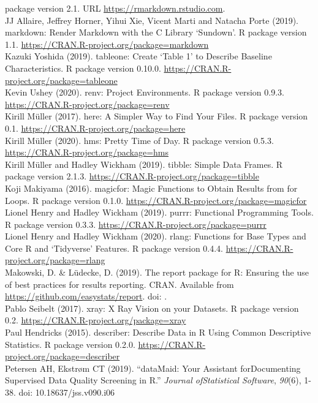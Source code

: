 \documentclass[
]{article}
\begin{document}
package version 2.1. URL \url{https://rmarkdown.rstudio.com}.\\
JJ Allaire, Jeffrey Horner, Yihui Xie, Vicent Marti and Natacha Porte
(2019). markdown: Render Markdown with the C Library `Sundown'. R
package version 1.1. \url{https://CRAN.R-project.org/package=markdown}\\
Kazuki Yoshida (2019). tableone: Create `Table 1' to Describe Baseline
Characteristics. R package version 0.10.0.
\url{https://CRAN.R-project.org/package=tableone}\\
Kevin Ushey (2020). renv: Project Environments. R package version 0.9.3.
\url{https://CRAN.R-project.org/package=renv}\\
Kirill Müller (2017). here: A Simpler Way to Find Your Files. R package
version 0.1. \url{https://CRAN.R-project.org/package=here}\\
Kirill Müller (2020). hms: Pretty Time of Day. R package version 0.5.3.
\url{https://CRAN.R-project.org/package=hms}\\
Kirill Müller and Hadley Wickham (2019). tibble: Simple Data Frames. R
package version 2.1.3. \url{https://CRAN.R-project.org/package=tibble}\\
Koji Makiyama (2016). magicfor: Magic Functions to Obtain Results from
for Loops. R package version 0.1.0.
\url{https://CRAN.R-project.org/package=magicfor}\\
Lionel Henry and Hadley Wickham (2019). purrr: Functional Programming
Tools. R package version 0.3.3.
\url{https://CRAN.R-project.org/package=purrr}\\
Lionel Henry and Hadley Wickham (2020). rlang: Functions for Base Types
and Core R and `Tidyverse' Features. R package version 0.4.4.
\url{https://CRAN.R-project.org/package=rlang}\\
Makowski, D. \& Lüdecke, D. (2019). The report package for R: Ensuring
the use of best practices for results reporting. CRAN. Available from
\url{https://github.com/easystats/report}. doi: .\\
Pablo Seibelt (2017). xray: X Ray Vision on your Datasets. R package
version 0.2. \url{https://CRAN.R-project.org/package=xray}\\
Paul Hendricks (2015). describer: Describe Data in R Using Common
Descriptive Statistics. R package version 0.2.0.
\url{https://CRAN.R-project.org/package=describer}\\
Petersen AH, Ekstrøm CT (2019). ``dataMaid: Your Assistant
forDocumenting Supervised Data Quality Screening in R.'' \emph{Journal
ofStatistical Software}, \emph{90}(6), 1-38. doi: 10.18637/jss.v090.i06
\end{document}
